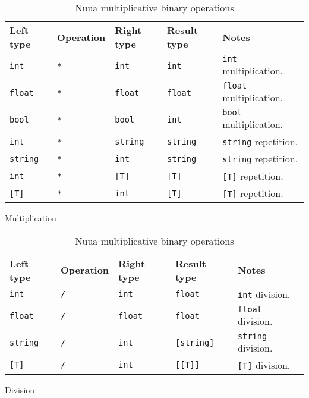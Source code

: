 \begin{table}[H]
	\centering
	\begin{subtable}{\textwidth}
		\centering
        \begin{tabular}{ l l l l p{9.5cm} }
            \textbf{Left type} & \textbf{Operation} & \textbf{Right type} & \textbf{Result type} & \textbf{Notes} \\
            \texttt{int} & \texttt{*} & \texttt{int} & \texttt{int} & \texttt{int} multiplication.\\
            \texttt{float} & \texttt{*} & \texttt{float} & \texttt{float} & \texttt{float} multiplication.\\
            \texttt{bool} & \texttt{*} & \texttt{bool} & \texttt{int} & \texttt{bool} multiplication.\\
            \texttt{int} & \texttt{*} & \texttt{string} & \texttt{string} & \texttt{string} repetition.\\
            \texttt{string} & \texttt{*} & \texttt{int} & \texttt{string} & \texttt{string} repetition.\\
            \texttt{int} & \texttt{*} & \texttt{[T]} & \texttt{[T]} & \texttt{[T]} repetition.\\
            \texttt{[T]} & \texttt{*} & \texttt{int} & \texttt{[T]} & \texttt{[T]} repetition.\\
		\end{tabular}
		\caption{Multiplication}
	\end{subtable}
	\begin{subtable}{\textwidth}
		\centering
        \begin{tabular}{ l l l l p{9.5cm} }
            \textbf{Left type} & \textbf{Operation} & \textbf{Right type} & \textbf{Result type} & \textbf{Notes} \\
            \texttt{int} & \texttt{/} & \texttt{int} & \texttt{float} & \texttt{int} division.\\
            \texttt{float} & \texttt{/} & \texttt{float} & \texttt{float} & \texttt{float} division.\\
            \texttt{string} & \texttt{/} & \texttt{int} & \texttt{[string]} & \texttt{string} division.\\
            \texttt{[T]} & \texttt{/} & \texttt{int} & \texttt{[[T]]} & \texttt{[T]} division.\\
		\end{tabular}
		\caption{Division}
	\end{subtable}
	\caption{Nuua multiplicative binary operations}
    \label{fig:nuua_multiplicative_bin_ops}
\end{table}

